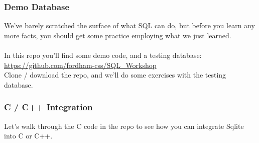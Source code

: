\documentclass[aspectratio=169]{beamer}
\begin{document}
\begin{frame}
    \frametitle{Demo Database}
    We've barely scratched the surface of what SQL can do, but before you learn
    any more facts, you should get some practice employing what we just learned.\\~\\
    In this repo you'll find some demo code, and a testing database:\\
    \url{https://github.com/fordham-css/SQL_Workshop}\\
    Clone / download the repo, and we'll do some exercises with the testing database.
\end{frame}
\begin{frame}
    \frametitle{C / C++ Integration}

    Let's walk through the C code in the repo to see how you can integrate Sqlite into C or C++.

\end{frame}
\end{document}
